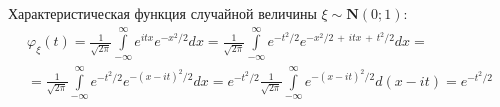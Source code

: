 \begin{exmp}
    Характеристическая функция случайной величины $\xi \sim \mathbf{N}(0;1)$:
    \begin{multline*}
        \varphi_{\xi}(t) 
        = \frac{1}{\sqrt{2 \pi}} \int\limits_{-\infty}^{\infty} e^{i t x} e^{-x^{2} / 2} d x
        = \frac{1}{\sqrt{2 \pi}} \int\limits_{-\infty}^{\infty} e^{-t^{2} / 2} e^{-x^2/2 \,+\, itx \,+\, t^2/2} d x = \\
        = \frac{1}{\sqrt{2 \pi}} \int\limits_{-\infty}^{\infty} e^{-t^{2} / 2} e^{-(x-i t)^{2} / 2} d x =  
         e^{-t^{2} / 2} \frac{1}{\sqrt{2 \pi}} \int\limits_{-\infty}^{\infty} e^{-(x-i t)^{2} / 2} d(x-i t)
        = e^{-t^{2} / 2}
    \end{multline*}
\end{exmp}

